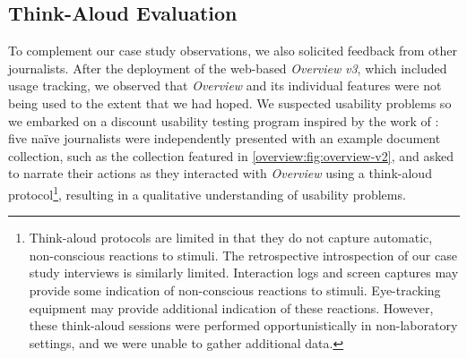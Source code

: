 

\subsection{Think-Aloud Evaluation}
\label{overview:eval-usability}


To complement our case study observations, we also solicited feedback from other journalists.
After the deployment of the web-based {\it Overview} {\it v3}, which included usage tracking, we observed that {\it Overview} and its individual features were not being used to the extent that we had hoped.
We suspected usability problems so we embarked on a discount usability testing program inspired by the work of \citet{Nielsen2000}: five na\"{i}ve journalists were independently presented with an example document collection, such as the collection featured in \autoref{overview:fig:overview-v2}, and asked to narrate their actions as they interacted with {\it Overview} using a think-aloud protocol\footnote{Think-aloud protocols are limited in that they do not capture automatic, non-conscious reactions to stimuli. The retrospective introspection of our case study interviews is similarly limited. Interaction logs and screen captures may provide some indication of non-conscious reactions to stimuli. Eye-tracking equipment may provide additional indication of these reactions. However, these think-aloud sessions were performed opportunistically in non-laboratory settings, and we were unable to gather additional data.}, resulting in a qualitative understanding of usability problems.

